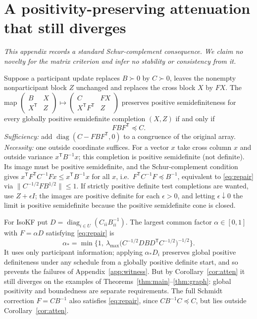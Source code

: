 \documentclass[11pt,a4paper]{article}
\numberwithin{equation}{section}
\theoremstyle{remark}\newtheorem{remark}[theorem]{Remark}
\newcommand{\T}{^{\mathsf T}}
\newcommand{\diag}{\operatorname{diag}}
\begin{document}
\section{A positivity-preserving attenuation that still diverges}\label{app:repair}

\emph{This appendix records a standard Schur-complement consequence. We claim no novelty for
the matrix criterion and infer no stability or consistency from it.}

Suppose a participant update replaces $B\succ0$ by $C\succ0$, leaves the nonempty nonparticipant
block $Z$ unchanged and replaces the cross block $X$ by $FX$. The map
$\left(\begin{smallmatrix}B&X\\X\T&Z\end{smallmatrix}\right)\mapsto
\left(\begin{smallmatrix}C&FX\\X\T F\T&Z\end{smallmatrix}\right)$ preserves positive
semidefiniteness for every globally positive semidefinite completion $(X,Z)$ if and only if
\begin{equation}\label{eq:repair}
FBF\T\preceq C.
\end{equation}
\emph{Sufficiency:} add $\diag(C-FBF\T,0)$ to a congruence of the original array.
\emph{Necessity:} one outside coordinate suffices. For a vector $x$ take cross column $x$ and
outside variance $x\T B^{-1}x$; this completion is positive semidefinite (not definite). Its
image must be positive semidefinite, and the Schur-complement condition gives
$x\T F\T C^{-1}Fx\le x\T B^{-1}x$ for all $x$, i.e.\ $F\T C^{-1}F\preceq B^{-1}$, equivalent to
\eqref{eq:repair} via $\|C^{-1/2}FB^{1/2}\|\le1$. If strictly positive definite test completions
are wanted, use $Z+\epsilon I$; the images are positive definite for each $\epsilon>0$, and
letting $\epsilon\downarrow0$ the limit is positive semidefinite because the positive
semidefinite cone is closed.

For IsoKF put $D=\diag_{i\in U}(C_{ii}B_{ii}^{-1})$. The largest common factor
$\alpha\in[0,1]$ with $F=\alpha D$ satisfying \eqref{eq:repair} is
\[
\alpha_*=\min\Big\{1,\ \lambda_{\max}\big(C^{-1/2}DBD\T C^{-1/2}\big)^{-1/2}\Big\}.
\]
It uses only participant information; applying $\alpha_*D_i$ preserves global positive
definiteness under any schedule from a globally positive definite start, and so prevents the
failures of Appendix~\ref{app:witness}. But by Corollary~\ref{cor:atten} it still diverges on
the examples of Theorems~\ref{thm:main}--\ref{thm:graph}: global positivity and boundedness are
separate requirements. The full Schmidt correction $F=CB^{-1}$ also satisfies \eqref{eq:repair},
since $CB^{-1}C\preceq C$, but lies outside Corollary~\ref{cor:atten}.



\end{document}
